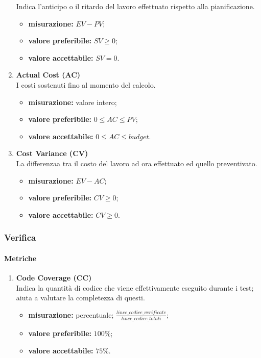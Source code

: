\begin{enumerate}
			Indica l'anticipo o il ritardo del lavoro effettuato rispetto alla pianificazione.
			\begin{itemize}
				\item \textbf{misurazione:} $EV-PV$;
				\item \textbf{valore preferibile:} $SV\geq 0$;
				\item \textbf{valore accettabile:} $SV=0$.
			\end{itemize}
		\item[]
			\textbf{Actual Cost (AC)}\\
			I costi sostenuti fino al momento del calcolo.
			\begin{itemize}
				\item \textbf{misurazione:} valore intero;
				\item \textbf{valore preferibile:} $0\leq AC\leq PV$;
				\item \textbf{valore accettabile:} $0\leq AC\leq budget$.
			\end{itemize}
		\item[]
			\textbf{Cost Variance (CV)}\\
			La differenzaa tra il costo del lavoro ad ora effettuato ed quello preventivato.
			\begin{itemize}
				\item \textbf{misurazione:} $EV-AC$;
				\item \textbf{valore preferibile:} $CV\geq 0$;
				\item \textbf{valore accettabile:} $CV\geq 0$.
			\end{itemize}
		\end{enumerate}
	\subsubsection{Verifica}
		\paragraph{Metriche}
		\begin{enumerate}
		\item[]
			\textbf{Code Coverage (CC)}\\
			Indica la quantità di codice che viene effettivamente eseguito durante i test; aiuta a valutare la completezza di questi.
			\begin{itemize}
				\item \textbf{misurazione:} percentuale; $\frac{linee\_codice\_verificate}{linee\_codice\_totali}$;
				\item \textbf{valore preferibile:} $100\%$;
				\item \textbf{valore accettabile:} $75\%$.
			\end{itemize}
		\end{enumerate}
